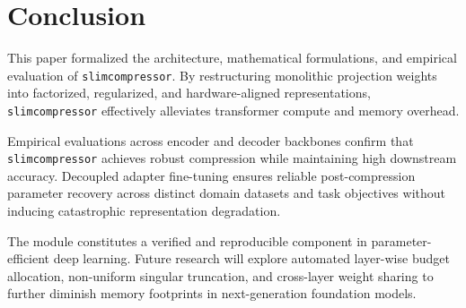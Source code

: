\section{Conclusion}
This paper formalized the architecture, mathematical formulations, and empirical evaluation of \texttt{slimcompressor}. By restructuring monolithic projection weights into factorized, regularized, and hardware-aligned representations, \texttt{slimcompressor} effectively alleviates transformer compute and memory overhead.

Empirical evaluations across encoder and decoder backbones confirm that \texttt{slimcompressor} achieves robust compression while maintaining high downstream accuracy. Decoupled adapter fine-tuning ensures reliable post-compression parameter recovery across distinct domain datasets and task objectives without inducing catastrophic representation degradation.

The module constitutes a verified and reproducible component in parameter-efficient deep learning. Future research will explore automated layer-wise budget allocation, non-uniform singular truncation, and cross-layer weight sharing to further diminish memory footprints in next-generation foundation models.
